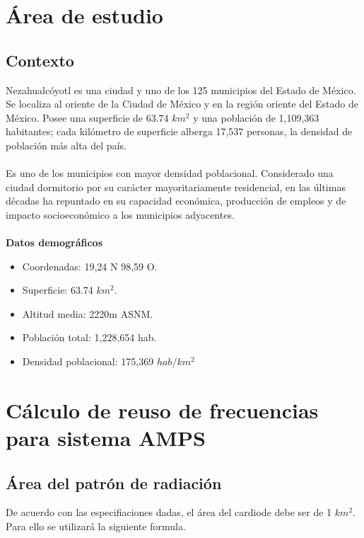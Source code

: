 \documentclass[11pt,letterpaper]{article}
\begin{document}


\newpage
\tableofcontents
\listoffigures
\listoftables

\newpage
\section{Área de estudio}
\subsection{Contexto}
Nezahualcóyotl es una ciudad y uno de los 125 municipios del Estado de México. Se localiza 
al oriente de la Ciudad de México y en la región oriente del Estado de México. Posee una 
superficie de 63.74 $km^2$ y una población de 1,109,363 habitantes; cada kilómetro de 
superficie alberga 17,537 personas, la densidad de población más alta del país.
\\ \\
Es uno de los municipios con mayor densidad poblacional. Considerado una ciudad dormitorio 
por su carácter mayoritariamente residencial, en las últimas décadas ha repuntado en su 
capacidad económica, producción de empleos y de impacto socioeconómico a los municipios 
adyacentes. \cite{uno}
\\ \\
\textbf{Datos demográficos}
\begin{itemize}
    \item Coordenadas: 19,24 N 98,59 O.
    \item Superficie: 63.74 $km^2$.
    \item Altitud media: 2220m ASNM.
    \item Población total: 1,228,654 hab.
    \item Densidad poblacional: 175,369 $hab/km^2$
\end{itemize}

\section{Cálculo de reuso de frecuencias para sistema AMPS}
\subsection{Área del patrón de radiación}
De acuerdo con las especifiaciones dadas, el área del cardiode debe ser de 1 $km^2$. Para ello 
se utilizará la siguiente formula.
\end{document}
